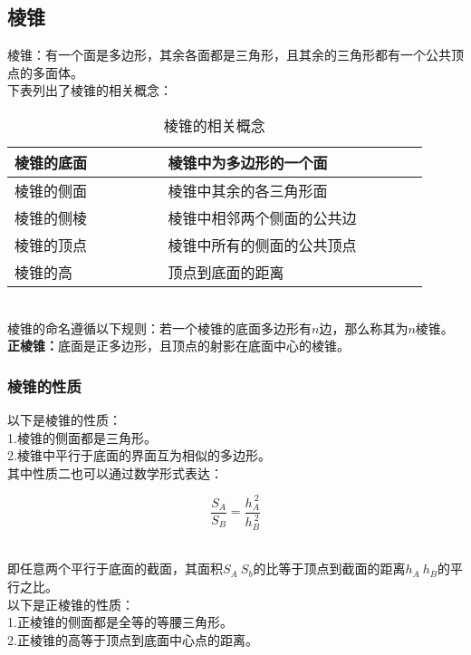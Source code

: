 \documentclass[UTF8]{ctexart}
\begin{document}
\newpage

\subsection{棱锥}
    棱锥：有一个面是多边形，其余各面都是三角形，且其余的三角形都有一个公共顶点的多面体。\\[3mm]
    下表列出了棱锥的相关概念：\vspace{5pt}
    \begin{table}[h]
        \begin{center}
            \begin{tabular}{l|l}
                \hline
                棱锥的底面~~~~~~~~&棱锥中为多边形的一个面~~~~~~~~\\ \hline
                棱锥的侧面~~~~~~~~&棱锥中其余的各三角形面~~~~~~~~\\ \hline
                棱锥的侧棱~~~~~~~~&棱锥中相邻两个侧面的公共边~~~~~~~~\\ \hline
                棱锥的顶点~~~~~~~~&棱锥中所有的侧面的公共顶点~~~~~~~~\\ \hline
                棱锥的高~~~~~~~~&顶点到底面的距离~~~~~~~~\\ \hline
            \end{tabular}
            \caption{棱锥的相关概念}
        \end{center}
    \end{table}\\
    棱锥的命名遵循以下规则：若一个棱锥的底面多边形有$n$边，那么称其为$n$棱锥。\\[3mm]
    \textbf{正棱锥：}底面是正多边形，且顶点的射影在底面中心的棱锥。\\

\subsubsection{棱锥的性质}
    以下是棱锥的性质：\\[3mm]
    1.棱锥的侧面都是三角形。\\[3mm]
    2.棱锥中平行于底面的界面互为相似的多边形。\\[3mm]
    其中性质二也可以通过数学形式表达：
    \begin{large}
        \begin{equation*}
            \frac{S_A}{S_B}=\frac{h_A^{~2}}{h_B^{~2}}
        \end{equation*}
    \end{large}\\
    即任意两个平行于底面的截面，其面积$S_A~S_b$的比等于顶点到截面的距离$h_A~h_B$的平行之比。\\[6mm]
    以下是正棱锥的性质：\\[3mm]
    1.正棱锥的侧面都是全等的等腰三角形。\\[3mm]
    2.正棱锥的高等于顶点到底面中心点的距离。
    
\end{document}
